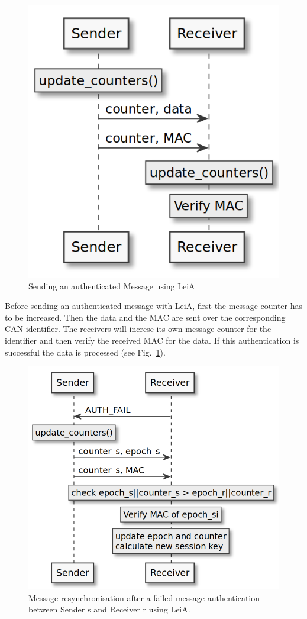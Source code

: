\begin{figure}[h]
    \centering
    \captionsetup{justification=centering}
	\includegraphics[width=0.6\linewidth]{Figures/LeiA_sending_msg.png}
	\caption[]{Sending an authenticated Message using LeiA}
	\label{fig:leia_sending_msg}
\end{figure}

Before sending an authenticated message with LeiA, first the message counter has
to be increased. Then the data and the MAC are sent over the corresponding CAN
identifier. The receivers will increse its own message counter for the
identifier and then verify the received MAC for the data. If this authentication
is successful the data is processed (see Fig.~\ref{fig:leia_sending_msg}).

\begin{figure}[h]
    \centering
    \captionsetup{justification=centering}
	\includegraphics[width=1\linewidth]{Figures/LeiA_resync.png}
    \caption[]{Message resynchronisation after a failed message authentication 
    between Sender s and Receiver r using LeiA.}
	\label{fig:leia_resync}
\end{figure}

